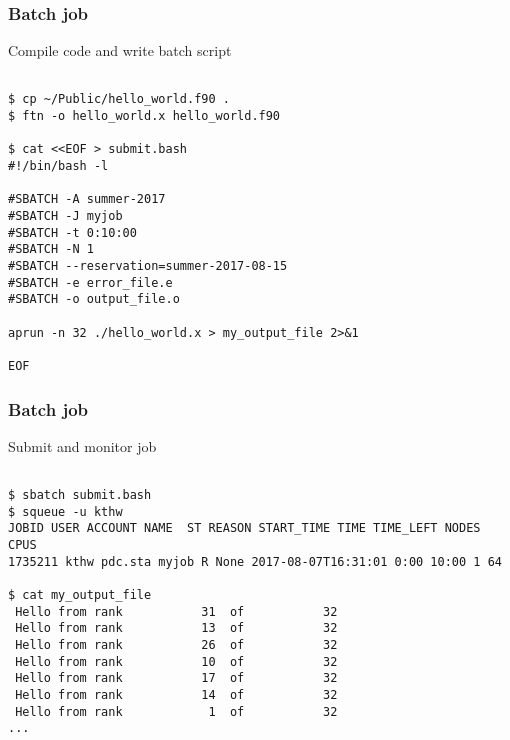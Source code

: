
\begin{frame}[fragile]
  \frametitle{Batch job}
  \begin{alertblock}{Compile code and write batch script}
    \verbatimfont{\footnotesize}
    \begin{verbatim}

$ cp ~/Public/hello_world.f90 .
$ ftn -o hello_world.x hello_world.f90

$ cat <<EOF > submit.bash
#!/bin/bash -l

#SBATCH -A summer-2017
#SBATCH -J myjob
#SBATCH -t 0:10:00
#SBATCH -N 1
#SBATCH --reservation=summer-2017-08-15
#SBATCH -e error_file.e
#SBATCH -o output_file.o

aprun -n 32 ./hello_world.x > my_output_file 2>&1

EOF

 \end{verbatim}
\end{alertblock}


\end{frame}



\begin{frame}[fragile]
  \frametitle{Batch job}
  \begin{alertblock}{Submit and monitor job}
    \verbatimfont{\footnotesize}
    \begin{verbatim}

$ sbatch submit.bash
$ squeue -u kthw
JOBID USER ACCOUNT NAME  ST REASON START_TIME TIME TIME_LEFT NODES CPUS
1735211 kthw pdc.sta myjob R None 2017-08-07T16:31:01 0:00 10:00 1 64

$ cat my_output_file
 Hello from rank           31  of           32
 Hello from rank           13  of           32
 Hello from rank           26  of           32
 Hello from rank           10  of           32
 Hello from rank           17  of           32
 Hello from rank           14  of           32
 Hello from rank            1  of           32
...


 \end{verbatim}
\end{alertblock}


\end{frame}



